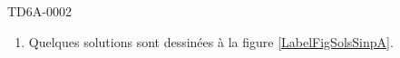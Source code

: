 \begin{corrige}{TD6A-0002}
\begin{enumerate}
        \item

            Quelques solutions sont dessinées à la figure \ref{LabelFigSolsSinpA}.
            \newcommand{\CaptionFigSolsSinpA}{Des solutions pour l'équation différentielle de l'exercice \ref{exoTD6A-0002}.}
            

    \end{enumerate}
  
\end{corrige}
